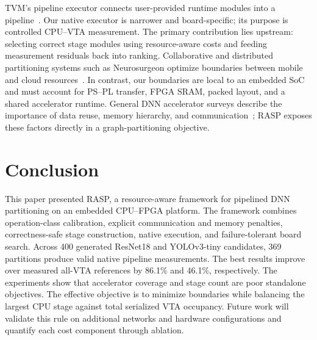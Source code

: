 \documentclass[conference]{IEEEtran}
\newcommand{\framework}{RASP}
\begin{document}
TVM's pipeline executor connects user-provided runtime modules into a pipeline~\cite{tvm_pipeline_executor}. Our native executor is narrower and board-specific; its purpose is controlled CPU--VTA measurement. The primary contribution lies upstream: selecting correct stage modules using resource-aware costs and feeding measurement residuals back into ranking. Collaborative and distributed partitioning systems such as Neurosurgeon optimize boundaries between mobile and cloud resources~\cite{kang2017neurosurgeon}. In contrast, our boundaries are local to an embedded SoC and must account for PS--PL transfer, FPGA SRAM, packed layout, and a shared accelerator runtime. General DNN accelerator surveys describe the importance of data reuse, memory hierarchy, and communication~\cite{sze2017efficient}; \framework{} exposes these factors directly in a graph-partitioning objective.

\section{Conclusion}

This paper presented \framework, a resource-aware framework for pipelined DNN partitioning on an embedded CPU--FPGA platform. The framework combines operation-class calibration, explicit communication and memory penalties, correctness-safe stage construction, native execution, and failure-tolerant board search. Across 400 generated ResNet18 and YOLOv3-tiny candidates, 369 partitions produce valid native pipeline measurements. The best results improve over measured all-VTA references by 86.1\% and 46.1\%, respectively. The experiments show that accelerator coverage and stage count are poor standalone objectives. The effective objective is to minimize boundaries while balancing the largest CPU stage against total serialized VTA occupancy. Future work will validate this rule on additional networks and hardware configurations and quantify each cost component through ablation.



\end{document}
